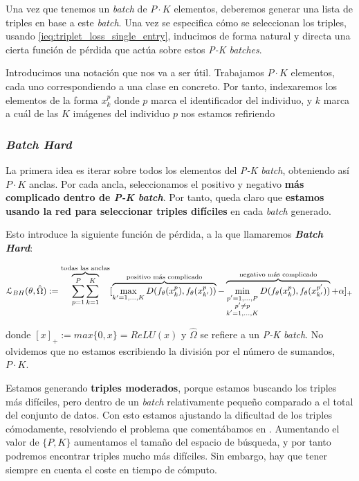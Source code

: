 Una vez que tenemos un \textit{batch} de $P \cdot K$ elementos, deberemos generar una lista de triples en base a este \textit{batch}. Una vez se especifica cómo se seleccionan los triples, usando \eqref{ieq:triplet_loss_single_entry}, inducimos de forma natural y directa una cierta función de pérdida que actúa sobre estos \textit{P-K batches}.

Introducimos una notación que nos va a ser útil. Trabajamos $P \cdot K$ elementos, cada uno correspondiendo a una clase en concreto. Por tanto, indexaremos los elementos de la forma $x_k^p$ donde $p$ marca el identificador del individuo, y $k$ marca a cuál de las $K$ imágenes del individuo $p$ nos estamos refiriendo

\subsubsection{\textit{Batch Hard}} \label{isubsubs:batch_hard}

La primera idea es iterar sobre todos los elementos del \textit{P-K batch}, obteniendo así $P \cdot K$ anclas. Por cada ancla, seleccionamos el positivo y negativo \textbf{más complicado dentro de \textit{P-K batch}}. Por tanto, queda claro que \textbf{estamos usando la red para seleccionar triples difíciles} en cada \textit{batch} generado.

Esto introduce la siguiente función de pérdida, a la que llamaremos \textbf{\textit{Batch Hard}}:

\begin{equation}
    \mathcal{L}_{BH}(\theta, \hat{\Omega}) := \overbrace{\sum_{p = 1}^P \sum_{k = 1}^K}^\textrm{\text{todas las anclas}} [
        \overbrace{\max_{k' = 1, \ldots, K} D(f_{\theta}(x_k^p), f_{\theta}(x_{k'}^p))}^\textrm{\text{positivo más complicado}}
        - \overbrace{\min_{\substack{p' = 1, \ldots, P \\ p' \neq p \\ k' = 1, \ldots, K}} D(f_{\theta}(x_k^p), f_{\theta}(x_{k'}^{p'}))}^\textrm{\text{negativo más complicado}}
        + \alpha]_+
\end{equation}

donde $[x]_+ := max \{0, x\} = ReLU(x)$ y $\hat{\Omega}$ se refiere a un \textit{P-K batch}. No olvidemos que no estamos escribiendo la división por el número de sumandos, $P \cdot K$.

Estamos generando \textbf{triples moderados}, porque estamos buscando los triples más difíciles, pero dentro de un \textit{batch} relativamente pequeño comparado a el total del conjunto de datos. Con esto estamos ajustando la dificultad de los triples cómodamente, resolviendo el problema que comentábamos en . Aumentando el valor de $\{P, K\}$ aumentamos el tamaño del espacio de búsqueda, y por tanto podremos encontrar triples mucho más difíciles. Sin embargo, hay que tener siempre en cuenta el coste en tiempo de cómputo.

